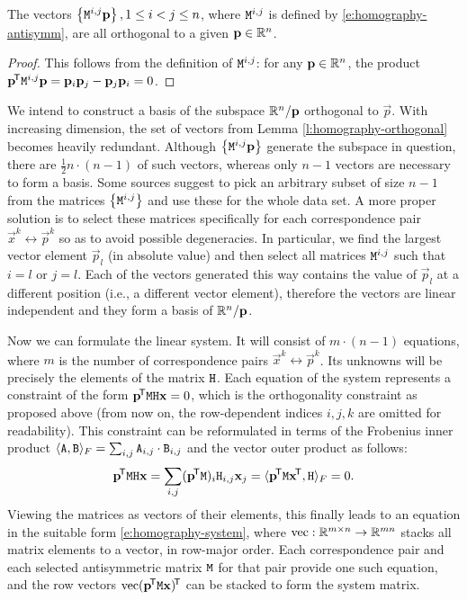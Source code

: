 \begin{lemma} \label{l:homography-orthogonal}
The vectors $\left\{ \mathtt{M}^{i, j} \mathbf{p} \right\}, 1 \leq i < j \leq n$, where $\mathtt{M}^{i,j}$ is defined by \eqref{e:homography-antisymm}, are all orthogonal to a given $\mathbf{p} \in \mathbb{R}^n$.
\end{lemma}
\begin{proof}
This follows from the definition of $\mathtt{M}^{i,j}$: for any $\mathbf{p} \in \mathbb{R}^n$, the product $\mathbf{p}^{\!\mathsf{T}} \mathtt{M}^{i, j} \mathbf{p} = \mathbf{p}_{i} \mathbf{p}_{j} - \mathbf{p}_{j} \mathbf{p}_{i} = 0$.
\end{proof}

We intend to construct a basis of the subspace $\mathbb{R}^n / \mathbf{p}$ orthogonal to $\vec p$.
With increasing dimension, the set of vectors from Lemma \ref{l:homography-orthogonal} becomes heavily redundant.
Although $\left\{ \mathtt{M}^{i, j} \mathbf{p} \right\}$ generate the subspace in question, there are $\frac {1} {2} n \cdot (n - 1)$ of such vectors, whereas only $n-1$ vectors are necessary to form a basis.
Some sources suggest to pick an arbitrary subset of size $n - 1$ from the matrices $\left\{ \mathtt{M}^{i, j} \right\}$ and use these for the whole data set.\cite{hartley03}
A more proper solution is to select these matrices specifically for each correspondence pair $\vec x^k \leftrightarrow \vec p^k$ so as to avoid possible degeneracies.
In particular, we find the largest vector element $\vec p_l$ (in absolute value) and then select all matrices $\mathtt{M}^{i, j}$ such that $i = l$ or $j = l$.
Each of the vectors generated this way contains the value of $\vec p_l$ at a different position (i.e., a different vector element), therefore the vectors are linear independent and they form a basis of $\mathbb{R}^n / \mathbf{p}$.

Now we can formulate the linear system.
It will consist of $m \cdot (n - 1)$ equations, where $m$ is the number of correspondence pairs $\vec x^k \leftrightarrow \vec p^k$.
Its unknowns will be precisely the elements of the matrix $\mathtt{H}$.
Each equation of the system represents a constraint of the form $\mathbf{p}^{\!\mathsf{T}} \mathtt{M} \mathtt{H} \mathbf{x} = 0$, which is the orthogonality constraint as proposed above (from now on, the row-dependent indices $i, j, k$ are omitted for readability).
This constraint can be reformulated in terms of the Frobenius inner product $\langle \mathtt{A}, \mathtt{B} \rangle_F = \sum_{i, j} \mathtt{A}_{i, j} \cdot \mathtt{B}_{i, j}$ and the vector outer product as follows:
$$\mathbf{p}^{\!\mathsf{T}} \mathtt{M} \mathtt{H} \mathbf{x} = \sum_{i, j} (\mathbf{p}^{\!\mathsf{T}} \mathtt{M})_i \mathtt{H}_{i, j} \mathbf{x}_j = \langle \mathbf{p}^{\!\mathsf{T}} \mathtt{M} \mathbf{x}^{\!\mathsf{T}}, \mathtt{H} \rangle_F = 0.$$
Viewing the matrices as vectors of their elements, this finally leads to an equation in the suitable form \eqref{e:homography-system},
where $\mathrm{vec} : \mathbb{R}^{m \times n} \to \mathbb{R}^{mn}$ stacks all matrix elements to a vector, in row-major order.
Each correspondence pair and each selected antisymmetric matrix $\mathtt{M}$ for that pair provide one such equation, and the row vectors $\mathrm{vec} ({\mathbf{p}}^{\!\mathsf{T}} \mathtt{M} \mathbf{x})^{\!\mathsf{T}}$ can be stacked to form the system matrix.

